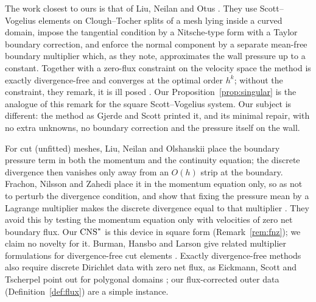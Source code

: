 The work closest to ours is that of Liu, Neilan and Otus \cite{LiuNeilanOtus2023}. They use Scott--Vogelius elements on Clough--Tocher splits of a mesh lying inside a curved domain, impose the tangential condition by a Nitsche-type form with a Taylor boundary correction, and enforce the normal component by a separate mean-free boundary multiplier which, as they note, approximates the wall pressure up to a constant. Together with a zero-flux constraint on the velocity space the method is exactly divergence-free and converges at the optimal order $h^k$; without the constraint, they remark, it is ill posed \cite[Remark~3.2]{LiuNeilanOtus2023}. Our Proposition~\ref{prop:singular} is the analogue of this remark for the square Scott--Vogelius system. Our subject is different: the method as Gjerde and Scott printed it, and its minimal repair, with no extra unknowns, no boundary correction and the pressure itself on the wall.

For cut (unfitted) meshes, Liu, Neilan and Olshanskii \cite{LiuNeilanOlshanskii2023} place the boundary pressure term in both the momentum and the continuity equation; the discrete divergence then vanishes only away from an $O(h)$ strip at the boundary. Frachon, Nilsson and Zahedi \cite{FrachonNilssonZahedi2024} place it in the momentum equation only, so as not to perturb the divergence condition, and show that fixing the pressure mean by a Lagrange multiplier makes the discrete divergence equal to that multiplier \cite[(5.7)--(5.9)]{FrachonNilssonZahedi2024}. They avoid this by testing the momentum equation only with velocities of zero net boundary flux. Our $\mathrm{CNS}^\ast$ is this device in square form (Remark~\ref{rem:fnz}); we claim no novelty for it. Burman, Hansbo and Larson give related multiplier formulations for divergence-free cut elements \cite{BurmanHansboLarson2024}. Exactly divergence-free methods also require discrete Dirichlet data with zero net flux, as Eickmann, Scott and Tscherpel point out for polygonal domains \cite{EickmannScottTscherpel2025}; our flux-corrected outer data (Definition~\ref{def:flux}) are a simple instance.

